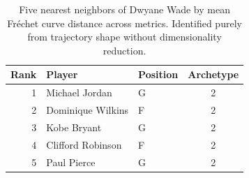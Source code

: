 \begin{table}[htbp]
  \centering\small
  \begin{tabular}{rllc}
    \toprule
    Rank & Player & Position & Archetype \\
    \midrule
    1 & Michael Jordan & G & 2 \\
    2 & Dominique Wilkins & F & 2 \\
    3 & Kobe Bryant & G & 2 \\
    4 & Clifford Robinson & F & 2 \\
    5 & Paul Pierce & G & 2 \\
    \bottomrule
  \end{tabular}
  \caption{Five nearest neighbors of Dwyane Wade by mean Fr\'{e}chet curve distance across metrics. Identified purely from trajectory shape without dimensionality reduction.}
  \label{tab:Dwyane_Wade_frechet_curve_neighbors}
\end{table}

